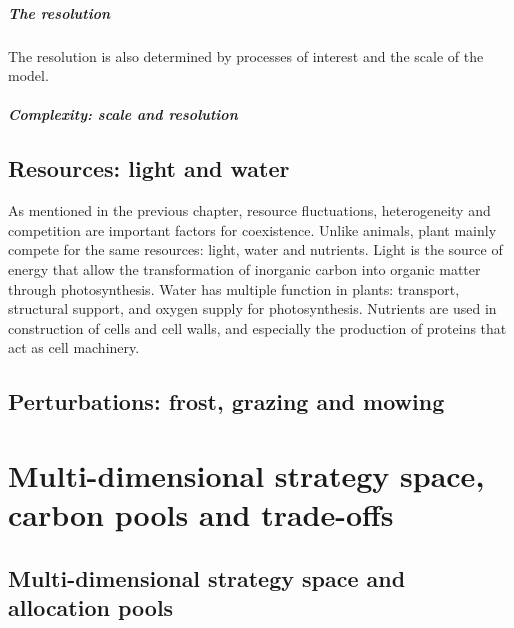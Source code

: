 \paragraph{The resolution} The resolution is also determined by processes of interest and the scale of the model. 

\paragraph{Complexity: scale and resolution}

\section{Resources: light and water}
As mentioned in the previous chapter, resource fluctuations, heterogeneity and competition are important factors for coexistence. Unlike animals, plant mainly compete for the same resources: light, water and nutrients. Light is the source of energy that allow the transformation of inorganic carbon into organic matter through photosynthesis. Water has multiple function in plants: transport, structural support, and oxygen supply for photosynthesis. Nutrients are used in construction of cells and cell walls, and especially the production of proteins that act as cell machinery.

\section{Perturbations: frost, grazing and mowing}

\chapter{Multi-dimensional strategy space, carbon pools and trade-offs}
\section{Multi-dimensional strategy space and allocation pools}
%


